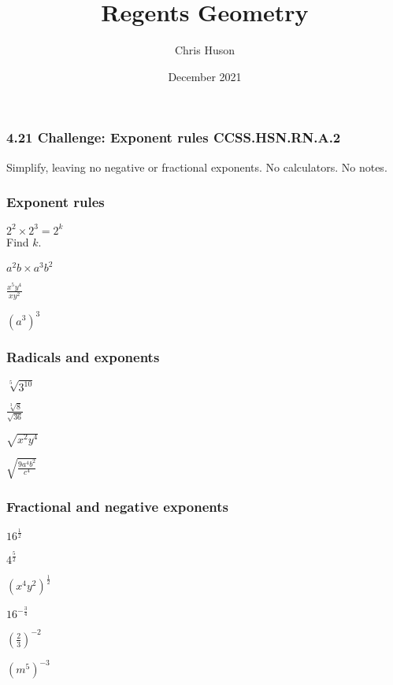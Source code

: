\documentclass[12pt, twoside]{article}
\title{Regents Geometry}
\author{Chris Huson}
\date{December 2021}
\begin{document}
\subsubsection*{4.21 Challenge: Exponent rules \hfill CCSS.HSN.RN.A.2}
Simplify, leaving no negative or fractional exponents. No calculators. No notes.
\begin{enumerate}[itemsep=2cm]
\subsubsection*{Exponent rules}  
  \begin{multicols}{2}
    \item $2^2 \times 2^3=2^k$ \\ Find $k$.
    \item $\displaystyle a^{2}b \times a^3 b^2$
    \item $\displaystyle \frac{x^5 y^{4}}{xy^{2}}$
    \item $(a^3)^3$
  \end{multicols} \vspace{1cm}

\subsubsection*{Radicals and exponents}
  \begin{multicols}{4}  
    \item $\sqrt[5]{3^{10}}$
    \item $\displaystyle \frac{\sqrt[3]{8}}{\sqrt{36}}$
    \item $\sqrt{x^2 y^4}$
    \item $\displaystyle  \sqrt{\frac{9a^4 b^2}{c^{4}}}$
    \end{multicols} \vspace{2cm}

\subsubsection*{Fractional and negative exponents}
  \begin{multicols}{2}  
    \item $\displaystyle 16^\frac{1}{2}$
    \item $\displaystyle 4^{\frac{5}{2}}$
    \item $\displaystyle (x^4 y^2)^\frac{1}{2}$
    \item $\displaystyle 16^{-\frac{3}{4}}$
    \item $\displaystyle \left(\frac{2}{3}\right)^{-2}$
    \item $\displaystyle (m^5)^{-3}$
  \end{multicols} \vspace{1cm}


\end{enumerate}
\end{document}
